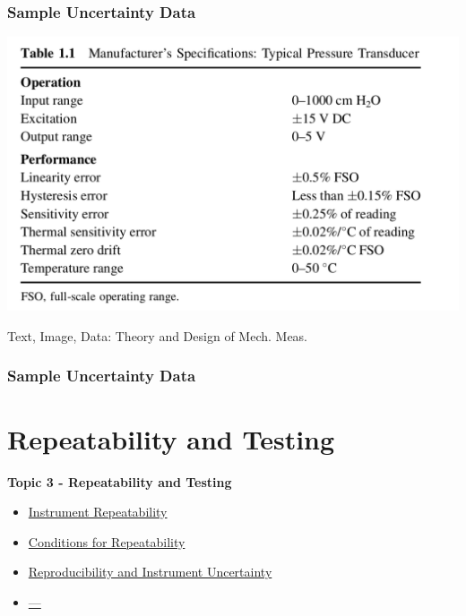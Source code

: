 \documentclass[fleqn]{beamer} %
\newcommand{\sectionIIItitle}{Repeatability and Testing}
\newcommand{\sectionIIsubsectionIVtitle}{Sample Uncertainty Data}
\newcommand{\sectionIIIsubsectionItitle}{Instrument Repeatability}
\newcommand{\sectionIIIsubsectionIItitle}{Conditions for Repeatability}
\newcommand{\sectionIIIsubsectionIIItitle}{Reproducibility and Instrument Uncertainty}
\newcommand{\sectionIIIsubsectionIVtitle}{---}
\begin{document}
			\begin{frame}
				\frametitle{\sectionIIsubsectionIVtitle}

				\includegraphics[scale=.22]{images/sample_uncertainties.png}

				{\tiny Text, Image, Data: Theory and Design of Mech. Meas.}


			\end{frame}

			\begin{frame}
				\frametitle{\sectionIIsubsectionIVtitle}




			\end{frame}

			\begin{frame}

			


			\end{frame}


		
	\section{\sectionIIItitle}\label{sectionIII}

		\begin{frame}
			\large \textbf{Topic 3 - \sectionIIItitle} \vspace{3mm}\\

			\begin{itemize}
				\item \hyperlink{sectionIIIsubsectionI}{\sectionIIIsubsectionItitle} \vspc %
				\item \hyperlink{sectionIIIsubsectionII}{\sectionIIIsubsectionIItitle} \vspc %
				\item \hyperlink{sectionIIIsubsectionIII}{\sectionIIIsubsectionIIItitle} \vspc %
				\item \hyperlink{sectionIIIsubsectionIV}{\sectionIIIsubsectionIVtitle} \vspc %
			\end{itemize}

		\end{frame}
\end{document}
